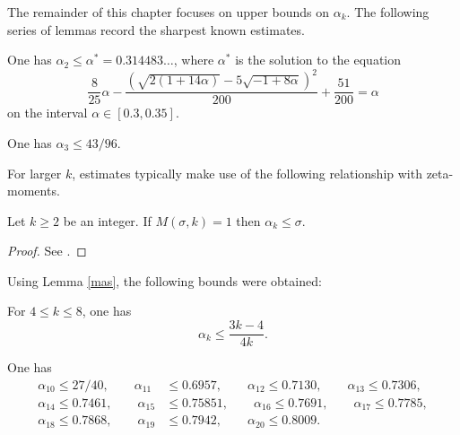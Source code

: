 The remainder of this chapter focuses on upper bounds on $\alpha_k$. The following series of lemmas record the sharpest known estimates.
\begin{theorem}\label{divisor-2-bound}\cite[Theorem 1.2]{li_yang_gauss_2024} One has $\alpha_2 \leq \alpha^* = 0.314483\ldots$, where $\alpha^*$ is the solution to the equation
\[
\frac{8}{25}\alpha - \frac{(\sqrt{2(1+14\alpha)} - 5\sqrt{-1+8\alpha})^2}{200} + \frac{51}{200} = \alpha
\]
on the interval $\alpha \in [0.3, 0.35]$.
\end{theorem}

\begin{theorem}\label{divisor-kolesnik}\cite{kolesnik} One has $\alpha_3 \leq 43/96$.
\end{theorem}

For larger $k$, estimates typically make use of the following relationship with zeta-moments.

\begin{lemma}\label{mas}  Let $k \geq 2$ be an integer. If $M(\sigma,k) = 1$ then $\alpha_k \leq \sigma$.
\end{lemma}

\begin{proof}  See \cite[\S 13.3]{ivic}.
\end{proof}

Using Lemma \ref{mas}, the following bounds were obtained:

\begin{theorem}\label{heathbrown-alpha-1981}\cite{heathbrown_mean_1981} For $4 \le k \le 8$, one has
\[
\alpha_k \leq \frac{3k-4}{4k}.
\]
\end{theorem}

\begin{theorem}\label{ivic-alpha-1989}\cite{ivic_ouellet_1989} One has
\begin{align*}
\alpha_{10} \le 27/40,\qquad \alpha_{11} &\le 0.6957,\qquad \alpha_{12} \le 0.7130,\qquad \alpha_{13} \le 0.7306,\\
\alpha_{14} \le 0.7461,\qquad \alpha_{15} &\le 0.75851,\qquad \alpha_{16} \le 0.7691,\qquad \alpha_{17} \le 0.7785,\\
\alpha_{18} \le 0.7868,\qquad \alpha_{19} &\le 0.7942,\qquad \alpha_{20} \le 0.8009.
\end{align*}
\end{theorem}


